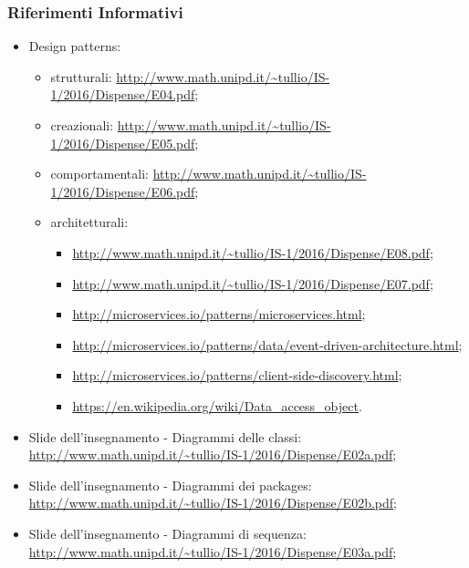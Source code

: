 	 \subsubsection{Riferimenti Informativi}
	  \begin{itemize}
	    \item Design patterns:
	      \begin{itemize}
	       \item strutturali:
	       \url{http://www.math.unipd.it/~tullio/IS-1/2016/Dispense/E04.pdf};
	       \item creazionali:
	       \url{http://www.math.unipd.it/~tullio/IS-1/2016/Dispense/E05.pdf};
	       \item comportamentali:
	       \url{http://www.math.unipd.it/~tullio/IS-1/2016/Dispense/E06.pdf};
	       \item architetturali:
	       \begin{itemize}
	       \item \url{http://www.math.unipd.it/~tullio/IS-1/2016/Dispense/E08.pdf};
	       \item \url{http://www.math.unipd.it/~tullio/IS-1/2016/Dispense/E07.pdf};
	       \item \url{http://microservices.io/patterns/microservices.html};
	       \item \url{http://microservices.io/patterns/data/event-driven-architecture.html};
	       \item \url{http://microservices.io/patterns/client-side-discovery.html};
	       \item \url{https://en.wikipedia.org/wiki/Data_access_object}.
	       \end{itemize}
	      \end{itemize}
	    \item Slide dell’insegnamento - Diagrammi delle classi:
	    \url{http://www.math.unipd.it/~tullio/IS-1/2016/Dispense/E02a.pdf};
	    \item Slide dell’insegnamento - Diagrammi dei packages:
	    \url{http://www.math.unipd.it/~tullio/IS-1/2016/Dispense/E02b.pdf};
	    \item Slide dell’insegnamento - Diagrammi di sequenza:
	    \url{http://www.math.unipd.it/~tullio/IS-1/2016/Dispense/E03a.pdf};

        
	  \end{itemize}